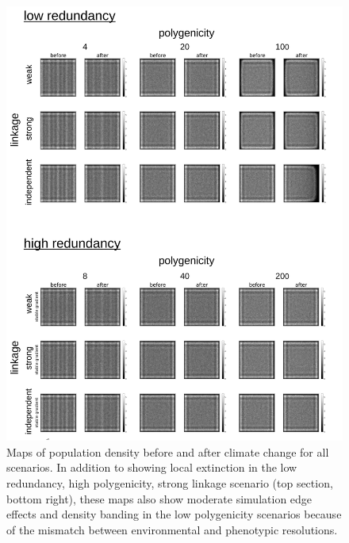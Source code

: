 \documentclass[9pt,twoside,lineno]{pnas-new}
\begin{document}
\begin{figure}
\centering
\includegraphics[width=.8\linewidth]{pub/figs_and_stats/FIG_S4_density_shift.jpg}
\caption{Maps of population density before and after climate change for all scenarios. In addition to showing local extinction in the low redundancy, high polygenicity, strong linkage scenario (top section, bottom right), these maps also show moderate simulation edge effects and density banding in the low polygenicity scenarios because of the mismatch between environmental and phenotypic resolutions.}
\label{fig:fig_s4}
\end{figure}
\end{document}
